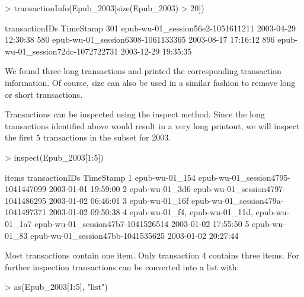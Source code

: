 \documentclass[10pt,a4paper]{article}
\begin{document}
\begin{Schunk}
\begin{Sinput}
> transactionInfo(Epub_2003[size(Epub_2003) > 20])
\end{Sinput}
\begin{Soutput}
                       transactionIDs           TimeStamp
301 epub-wu-01_session56e2-1051611211 2003-04-29 12:30:38
580 epub-wu-01_session6308-1061133365 2003-08-17 17:16:12
896 epub-wu-01_session72dc-1072722731 2003-12-29 19:35:35

\end{Soutput}
\end{Schunk}

We found three long transactions and printed the corresponding
transaction information. Of course, size can also be used in a similar
fashion to remove long or short transactions.

Transactions can be inspected using the inspect method. 
Since the long transactions identified above would result in
a very long printout, we will inspect 
the first 5 transactions in the subset for 2003.

\begin{Schunk}
\begin{Sinput}
> inspect(Epub_2003[1:5])
\end{Sinput}
\begin{Soutput}
  items                               transactionIDs           TimeStamp
1 {epub-wu-01_154} epub-wu-01_session4795-1041447099 2003-01-01 19:59:00
2 {epub-wu-01_3d6} epub-wu-01_session4797-1041486295 2003-01-02 06:46:01
3 {epub-wu-01_16f} epub-wu-01_session479a-1041497371 2003-01-02 09:50:38
4 {epub-wu-01_f4,                                                       
   epub-wu-01_11d,                                                      
   epub-wu-01_1a7} epub-wu-01_session47b7-1041526514 2003-01-02 17:55:50
5 {epub-wu-01_83}  epub-wu-01_session47bb-1041535625 2003-01-02 20:27:44

\end{Soutput}
\end{Schunk}

Most transactions contain one item. Only transaction 4 contains three items. 
For further inspection transactions can be converted into a list with:

\begin{Schunk}
\begin{Sinput}
> as(Epub_2003[1:5], "list")
\end{Sinput}
\end{Schunk}
\end{document}
